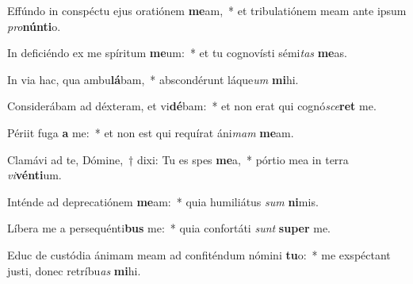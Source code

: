 \item Effúndo in conspéctu ejus oratiónem \textbf{me}am,~* et tribulatiónem meam ante ipsum \textit{pro}\textbf{nún}\textbf{ti}o.
\item In deficiéndo ex me spíritum \textbf{me}um:~* et tu cognovísti sémi\textit{tas} \textbf{me}as.
\item In via hac, qua ambu\textbf{lá}bam,~* abscondérunt láque\textit{um} \textbf{mi}hi.
\item Considerábam ad déxteram, et vi\textbf{dé}bam:~* et non erat qui cognó\textit{sce}\textbf{ret} me.
\item Périit fuga \textbf{a} me:~* et non est qui requírat áni\textit{mam} \textbf{me}am.
\item Clamávi ad te, Dómine,~† dixi: Tu es spes \textbf{me}a,~* pórtio mea in terra \textit{vi}\textbf{vén}\textbf{ti}um.
\item Inténde ad deprecatiónem \textbf{me}am:~* quia humiliátus \textit{sum} \textbf{ni}mis.
\item Líbera me a persequénti\textbf{bus} me:~* quia confortáti \textit{sunt} \textbf{su}\textbf{per} me.
\item Educ de custódia ánimam meam ad confiténdum nómini \textbf{tu}o:~* me exspéctant justi, donec retríbu\textit{as} \textbf{mi}hi.
